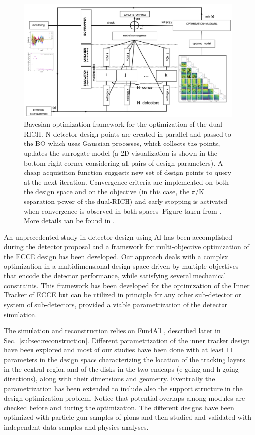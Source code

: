 \begin{figure}[!]
    \centering
    \includegraphics[scale = 0.21]{figs/dRICH_BO_scheme.png}
    \caption{
    Bayesian optimization framework for the optimization of the dual-RICH. N detector design points are created in parallel and passed to the BO which uses Gaussian processes, which collects the points, updates the surrogate model (a 2D visualization is shown in the bottom right corner considering all pairs of design parameters). A cheap acquisition function suggests new set of design points to query at the next iteration. Convergence criteria are implemented on both the design space and on the objective (in this case, the $\pi$/K separation power of the dual-RICH) and early stopping is activated when convergence is observed in both spaces. Figure taken from \cite{fanelli_jluo2021}. More details can be found in \cite{cisbani2020ai}.   
    }
    \label{fig:dRICH_BO_scheme}
\end{figure}

An unprecedented study in detector design using AI has been accomplished during the detector proposal and a framework for multi-objective optimization of the ECCE design has been developed. 
Our approach deals with a complex optimization in a multidimensional design space driven by multiple objectives that encode the detector performance, while satisfying several mechanical constraints. 
This framework has been developed for the optimization of the Inner Tracker of ECCE but can be utilized in principle for any other sub-detector or system of sub-detectors, provided a viable parametrization of the detector simulation. 

The simulation and reconstruction relies on Fun4All \cite{fun4allGithub}, described later in Sec.~\ref{subsec:reconstruction}. 
Different parametrization of the inner tracker design have been explored and most of our studies have been done with at least 11 parameters in the design space characterizing the location of the tracking layers in the central region and of the disks in the two endcaps (e-going and h-going directions), along with their dimensions and geometry. 
Eventually the parametrization has been extended to include also the support structure in the design optimization problem.   
Notice that potential overlaps among modules are checked before and during the optimization. 
The different designs have been optimized with particle gun samples of pions and then studied and validated with independent data samples and physics analyses.  

